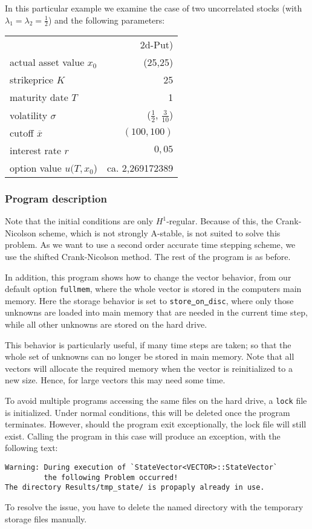 In this particular example we examine the case of two uncorrelated stocks (with $\lambda_1=\lambda_2=\frac12$) and the following parameters:
 \begin{table}[hb]
    \centering
    \begin{tabular}{lr}
      \toprule 
 & 2d-Put)\\
       \cmidrule(l){2-2}
	 actual asset value $x_0$ 	&  (25,25)\\
	 strikeprice $K$			&  25 \\
	 maturity date $T$ 			& 1 \\
	 volatility $\sigma$		&  ($\frac12$, $\frac 3{10}$) \\
	 cutoff $\overline x$		& $(100,100)$\\
	 interest rate $r$ 				&  $0{,}05$\\
	 option value $u(T,x_0$)			& ca.  2{,}269172389 \\
      \bottomrule
    \end{tabular}
  \end{table}

\subsubsection{Program description}
Note that the initial conditions are only $H^1$-regular. Because of this, 
the Crank-Nicolson scheme, which is not strongly A-stable, is not suited to solve 
this problem. As we want to use a second order accurate time stepping scheme, we use 
the shifted Crank-Nicolson method. The rest of the program is as before.

In addition, this program shows how to change the vector behavior, from our
default option \texttt{fullmem}, where the whole vector
is stored in the computers main memory. Here the storage behavior is set to 
\texttt{store\underline{ }on\underline{ }disc}, where only those unknowns are loaded into 
main memory that are needed in the current time step, while all other 
unknowns are stored on the hard drive. 

This behavior is particularly useful, if many time steps are taken; so that the 
whole set of unknowns can no longer be stored in main memory. Note that all vectors 
will allocate the required memory when the vector is reinitialized to a new size.
Hence, for large vectors this may need some time.

To avoid multiple programs accessing the same files on the hard drive, a 
\texttt{lock} file is initialized. Under normal conditions, this will be deleted 
once the program terminates. However, should the program exit exceptionally, the 
lock file will still exist. Calling the program in this case will produce an 
exception, with the following text:
\begin{verbatim}
Warning: During execution of `StateVector<VECTOR>::StateVector` 
         the following Problem occurred!
The directory Results/tmp_state/ is propaply already in use.
\end{verbatim}
To resolve the issue, you have to delete the named directory with the 
temporary storage files manually.